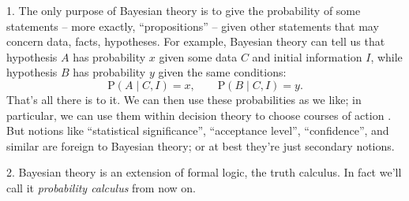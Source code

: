 \documentclass[\ifafour a4paper,12pt,\else a5paper,10pt,\fi%
onecolumn,oneside,article,%
british%
]{memoir}
\theoremstyle{remark}
\theoremstyle{innote}
\newcommand*{\citep}{\parencites}
\newcommand*{\p}{\mathrm{P}}%
\renewcommand*{\|}{\mathpunct{|}}
\begin{document}
1. The only purpose of Bayesian theory is to give the probability of some
statements -- more exactly, \enquote{propositions}
\citep{copietal1953_r2014,barwiseetal1999_r2003} -- given other statements
that may concern data, facts, hypotheses. For example, Bayesian theory can
tell us that hypothesis $A$ has probability $x$ given some data $C$ and
initial information $I$, while hypothesis $B$ has probability $y$ given the
same conditions:
\begin{equation*}
  \p(A \| C, I ) = x, \qquad   \p(B \| C, I ) = y.
\end{equation*}
That's all there is to it. We can then use these probabilities as we like;
in particular, we can use them within decision theory to choose courses of
action \citep{raiffaetal1961_r2000,prattetal1995_r1996,soxetal1988_r2013}.
But notions like \enquote{statistical significance}, \enquote{acceptance
  level}, \enquote{confidence}, and similar are foreign to Bayesian theory;
or at best they're just secondary notions.

\medskip

2. Bayesian theory is an extension of formal logic, the truth calculus. In
fact we'll call it \emph{probability calculus} from now on.
\end{document}
